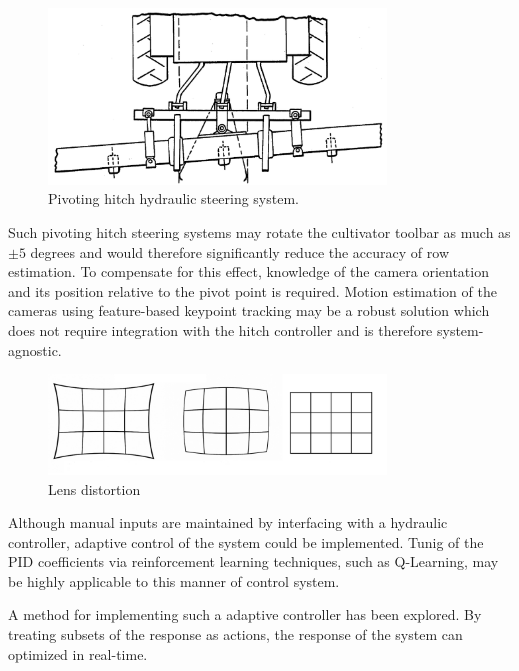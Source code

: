 \documentclass[authoryear]{elsarticle}
\begin{document}
\begin{figure}
  \centering
  \includegraphics[width=0.8\textwidth,natwidth=610,natheight=642]{pivoting_hitch.png}
  \caption{Pivoting hitch hydraulic steering system.}
  \label{fig:pivoting_hitch}
\end{figure}

Such pivoting hitch steering systems may rotate the cultivator toolbar
as much as $\pm5$ degrees and would therefore significantly
reduce the accuracy of row estimation. To compensate for this effect,
knowledge of the camera orientation and its position relative to the
pivot point is required. Motion estimation of the cameras using
feature-based keypoint tracking may be a robust solution which does
not require integration with the hitch controller and is therefore
system-agnostic.

\begin{figure}
  \centering
  \includegraphics[width=0.8\textwidth,natwidth=610,natheight=642]{lens_distortion.jpg}
  \caption{Lens distortion}
  \label{fig:distortion}
\end{figure}

Although manual inputs are maintained by interfacing with a hydraulic
controller, adaptive control of the system could be implemented. Tunig
of the PID coefficients via reinforcement learning techniques, such as
Q-Learning, may be highly applicable to this manner of control system.

A method for implementing such a adaptive controller has been
explored. By treating subsets of the response as actions, the
response of the system can optimized in real-time. 
\end{document}

